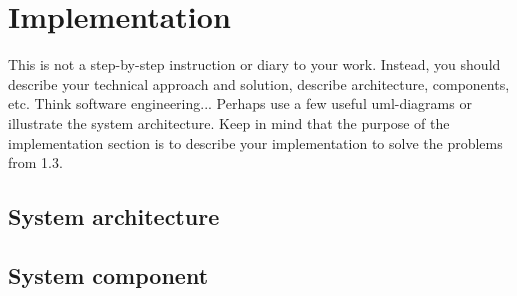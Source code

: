 \section{Implementation}
This is not a step-by-step instruction or diary to your work. Instead, you should describe your technical approach and solution, describe architecture, components, etc. Think software engineering... Perhaps use a few useful uml-diagrams or illustrate the system architecture. Keep in mind that the purpose of the implementation section is to describe your implementation to solve the problems from 1.3.
\subsection{System architecture}
\subsection{System component}